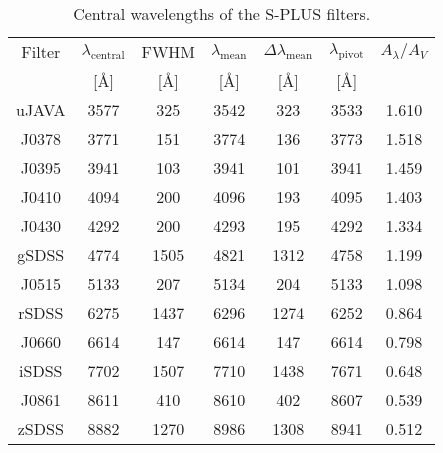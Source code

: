 \begin{table*}
\centering
\caption{Central wavelengths of the S-PLUS filters.}
\label{tab:central_wavelengths}
\begin{tabular}{ccccccc}
\hline
\hline
Filter & $\lambda_{\mathrm{central}}$ & FWHM & $\lambda_{\mathrm{mean}}$ & $\Delta\lambda_{\mathrm{mean}}$ & $\lambda_{\mathrm{pivot}}$ & $A_{\lambda}/A_{V}$ \\
 & [\AA] & [\AA] & [\AA] & [\AA] & [\AA] & \\
\hline
uJAVA & 3577 & 325 & 3542 & 323 & 3533 & 1.610\\
J0378 & 3771 & 151 & 3774 & 136 & 3773 & 1.518\\
J0395 & 3941 & 103 & 3941 & 101 & 3941 & 1.459\\
J0410 & 4094 & 200 & 4096 & 193 & 4095 & 1.403\\
J0430 & 4292 & 200 & 4293 & 195 & 4292 & 1.334\\
gSDSS & 4774 & 1505 & 4821 & 1312 & 4758 & 1.199\\
J0515 & 5133 & 207 & 5134 & 204 & 5133 & 1.098\\
rSDSS & 6275 & 1437 & 6296 & 1274 & 6252 & 0.864\\
J0660 & 6614 & 147 & 6614 & 147 & 6614 & 0.798\\
iSDSS & 7702 & 1507 & 7710 & 1438 & 7671 & 0.648\\
J0861 & 8611 & 410 & 8610 & 402 & 8607 & 0.539\\
zSDSS & 8882 & 1270 & 8986 & 1308 & 8941 & 0.512\\
\hline
\end{tabular}
\end{table*}
